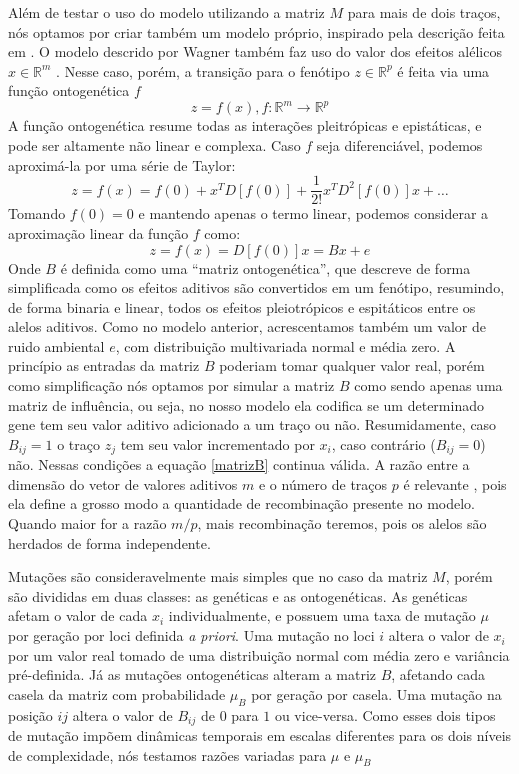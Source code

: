 \documentclass[a4paper, 12pt, titlepage, onecolumn]{article}
\numberwithin{equation}{section}
\numberwithin{table}{section}
\begin{document}
Além de testar o uso do modelo utilizando a matriz $M$ para mais de dois
traços, nós optamos por criar também um modelo próprio, inspirado pela
descrição feita em \cite{Wagner1984}. O modelo descrido por Wagner
também faz uso do valor dos efeitos alélicos $x \in \mathbb{R}^m$  . Nesse caso, porém, a
transição para o fenótipo $z \in \mathbb{R}^p$ é feita via uma função ontogenética $f$
\begin{equation}
z = f(x), f:\mathbb{R}^m \rightarrow \mathbb{R}^{p}
\end{equation}
A função ontogenética resume todas as interações pleitrópicas e
epistáticas, e pode ser altamente não linear e complexa. Caso $f$ seja
diferenciável, podemos aproximá-la por uma série de Taylor:
\begin{equation}
z = f(x) = f(0) + x^T D[f(0)] + \frac{1}{2!} x^T D^2 [f(0)] x + \ldots
\end{equation}
Tomando $f(0) = 0$ e mantendo apenas o termo linear, podemos considerar
a aproximação linear da função $f$ como:
\begin{equation}
z = f(x) = D[f(0)]x = Bx + e
\label{matrizB}
\end{equation}
Onde $B$ é definida como uma ``matriz ontogenética'', que descreve de
forma simplificada como os efeitos aditivos são convertidos em um
fenótipo, resumindo, de forma binaria e linear, todos os efeitos
pleiotrópicos e espitáticos entre os alelos aditivos. Como no modelo
anterior, acrescentamos também um valor de ruido ambiental $e$, com
distribuição multivariada normal e média zero.  A princípio as entradas
da matriz $B$ poderiam tomar qualquer valor real, porém como
simplificação nós optamos por simular a matriz $B$ como sendo apenas uma
matriz de influência, ou seja, no nosso modelo ela codifica se um
determinado gene tem seu valor aditivo adicionado a um traço ou não.
Resumidamente, caso $B_{ij} = 1$ o traço $z_j$ tem seu valor
incrementado por $x_i$, caso contrário ($B_{ij} = 0$) não.  Nessas
condições a equação \ref{matrizB} continua válida. A razão entre a
dimensão do vetor de valores aditivos $m$ e o número de traços $p$ é
relevante \citep{Wagner1984}, pois ela define a grosso modo a quantidade
de recombinação presente no modelo. Quando maior for a razão $m/p$, mais
recombinação teremos, pois os alelos são herdados de forma independente. 

Mutações são consideravelmente mais simples que no caso da
matriz $M$, porém são divididas em duas classes: as genéticas e as
ontogenéticas. As genéticas afetam o valor de cada $x_i$
individualmente, e possuem uma taxa de mutação $\mu$ por geração por
loci definida {\it a priori}. Uma mutação no loci $i$ altera o valor de $x_i$
por um valor real tomado de uma distribuição normal com média zero e
variância pré-definida.  Já as mutações ontogenéticas alteram a matriz
$B$, afetando cada casela da matriz com probabilidade $\mu_B$ por
geração por casela. Uma mutação na posição $ij$ altera o valor de
$B_{ij}$ de $0$ para $1$ ou vice-versa. Como esses dois tipos de mutação
impõem dinâmicas temporais em escalas diferentes para os dois níveis de
complexidade, nós testamos razões variadas para $\mu$ e $\mu_B$
\end{document}
